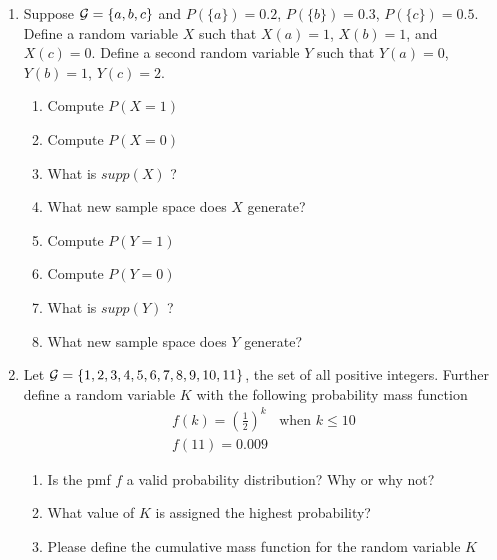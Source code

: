 \begin{enumerate}
    \item Suppose $\mathcal{G} = \{ a,b,c \}$ and $P(\{a\})=0.2$, $P(\{b\})=0.3$, $P(\{c\})=0.5$. Define a random variable $X$ such that $X(a)=1$, $X(b)=1$, and $X(c)=0$.
    Define a second random variable $Y$ such that $Y(a)=0$, $Y(b) = 1$, $Y(c)=2$.
    \begin{enumerate}
        \item Compute $P(X=1)$
        \item Compute $P(X=0)$
        \item What is $supp(X)$ ? 
        \item What new sample space does $X$ generate?
        \item Compute $P(Y=1)$
        \item Compute $P(Y=0)$
        \item What is $supp(Y)$ ? 
        \item What new sample space does $Y$ generate?
    \end{enumerate}
    \item Let $\mathcal{G} = \{1,2,3,4,5,6,7,8,9,10,11\}$, the set of all positive integers. Further define a random variable $K$ with the following probability mass function 
    \begin{align*}
        f(k) = \left( \frac{1}{2} \right) ^{k} & \text{when } k \leq 10\\
        f(11) = 0.009
    \end{align*} 
    \begin{enumerate}
        \item Is the pmf $f$ a valid probability distribution? Why or why not?
        \item What value of $K$ is assigned the highest probability? 
        \item Please define the cumulative mass function for the random variable $K$
    \end{enumerate}
    

\end{enumerate}
